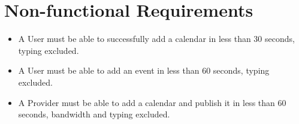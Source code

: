 \documentclass[10pt]{report}
\numberwithin{equation}{section} %
\numberwithin{figure}{section} %
\numberwithin{table}{section} %
\begin{document}
\section{Non-functional Requirements}
\begin{itemize}
\item A User must be able to successfully add a calendar in less than 30
  seconds, typing excluded.
\item A User must be able to add an event in less than 60 seconds, typing
  excluded.
\item A Provider must be able to add a calendar and publish it in less than 60
  seconds, bandwidth and typing excluded.
\end{itemize}
\end{document}
